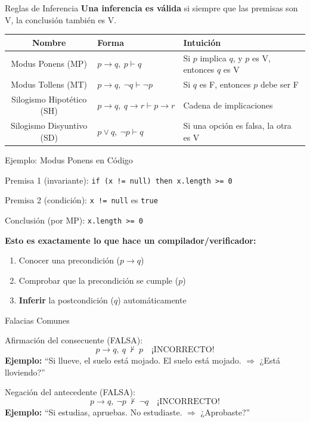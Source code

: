 \documentclass[aspectratio=169,10pt]{beamer}
\begin{document}
\begin{frame}{Reglas de Inferencia}
\textbf{Una inferencia es válida} si siempre que las premisas son V, la conclusión también es V.

\vspace{0.5em}
\begin{tabular}{cll}
\hline
\textbf{Nombre} & \textbf{Forma} & \textbf{Intuición} \\
\hline
Modus Ponens (MP) & $p\to q,\ p \vdash q$ & Si $p$ implica $q$, y $p$ es V, entonces $q$ es V \\
Modus Tollens (MT) & $p\to q,\ \neg q \vdash \neg p$ & Si $q$ es F, entonces $p$ debe ser F \\
Silogismo Hipotético (SH) & $p\to q,\ q\to r \vdash p\to r$ & Cadena de implicaciones \\
Silogismo Disyuntivo (SD) & $p\lor q,\ \neg p \vdash q$ & Si una opción es falsa, la otra es V \\
\hline
\end{tabular}
\end{frame}

\begin{frame}{Ejemplo: Modus Ponens en Código}
\begin{block}{Premisa 1 (invariante):} \texttt{if (x != null) then x.length >= 0}
\end{block}
\begin{block}{Premisa 2 (condición):} \texttt{x != null} es \texttt{true}
\end{block}
\begin{block}{Conclusión (por MP):} \texttt{x.length >= 0}
\end{block}
\vfill
\pause
\textbf{Esto es exactamente lo que hace un compilador/verificador:}
\begin{enumerate}
\item Conocer una precondición ($p\to q$)
\item Comprobar que la precondición se cumple ($p$)
\item \textbf{Inferir} la postcondición ($q$) automáticamente
\end{enumerate}
\end{frame}

\begin{frame}{Falacias Comunes}
\begin{block}{Afirmación del consecuente (FALSA):}
\[
p\to q,\ q \ \not\vdash\ p \quad \text{¡INCORRECTO!}
\]
\textbf{Ejemplo:} ``Si llueve, el suelo está mojado. El suelo está mojado. $\Rightarrow$ ¿Está lloviendo?''
\end{block}
\pause
\vfill
\begin{block}{Negación del antecedente (FALSA):}
\[
p\to q,\ \neg p \ \not\vdash\ \neg q \quad \text{¡INCORRECTO!}
\]
\textbf{Ejemplo:} ``Si estudias, apruebas. No estudiaste. $\Rightarrow$ ¿Aprobaste?''
\end{block}
\end{frame}
\end{document}
